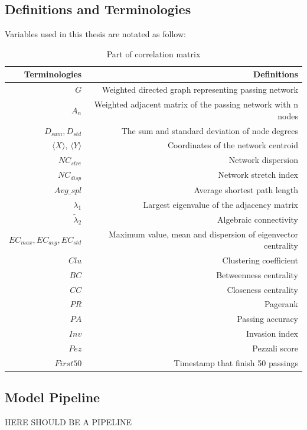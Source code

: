 \documentclass{mcmthesis}
\begin{document}
\subsection{Definitions and Terminologies}
Variables used in this thesis are notated as follow:
\begin{table}[ht]
  \caption{Part of correlation matrix}
  \begin{center}
      \begin{tabular}{r|r}
          \toprule
            Terminologies & Definitions\\
          \midrule
          $G$ & Weighted directed graph representing passing network\\
          $A_{n}$ & Weighted adjacent matrix of the passing network with n nodes\\
          $D_{sum}, D_{std}$ & The sum and standard deviation of node degrees\\
          $\langle X\rangle$, $\langle Y\rangle$ & Coordinates of the network centroid \\
          $NC_{stre} $& Network dispersion\\
          $NC_{disp}$ & Network stretch index\\
          $Avg\_spl$ & Average shortest path length\\
          $\lambda_1$ & Largest eigenvalue of the adjacency matrix\\
           $\tilde\lambda_2$ & Algebraic connectivity\\
           $EC_{max},EC_{avg},EC_{std}$ & Maximum value, mean and dispersion of eigenvector centrality\\
           $Clu$ & Clustering coefficient\\
           $BC$ & Betweenness centrality\\
           $CC$ & Closeness centrality\\
           $PR$ & Pagerank\\
           $PA$ & Passing accuracy\\
           $Inv$ & Invasion index\\
           $Pez$ & Pezzali score \\
           $First50$&Timestamp that finish 50 passings\\
          \bottomrule
      \end{tabular}
  \end{center}
\end{table}
\subsection{Model Pipeline}
HERE SHOULD BE A PIPELINE
\end{document}
